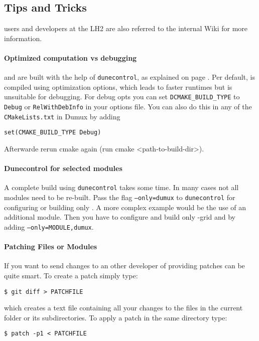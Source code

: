 \subsection{Tips and Tricks}
\Dumux users and developers at the LH2 are also referred to the internal Wiki for
more information.

\paragraph{Optimized computation vs debugging}
\Dune and \Dumux are built with the help of \texttt{dunecontrol}, as explained on page \pageref{buildIt}.
Per default, \Dumux is compiled using optimization options, which leads to faster runtimes but is unsuitable
for debugging. For debug opts you can set \texttt{DCMAKE_BUILD_TYPE} to \texttt{Debug} or \texttt{RelWithDebInfo}
in your options file. You can also do this in any of the \texttt{CMakeLists.txt} in Dumux by adding

\begin{lstlisting}[style=Shell]
set(CMAKE_BUILD_TYPE Debug)
\end{lstlisting}

Afterwarde rerun cmake again (run cmake <path-to-build-dir>).

\paragraph{Dunecontrol for selected modules}
A complete build using \texttt{dunecontrol} takes some time. In many cases not all modules need to be re-built.
Pass the flag \texttt{--only=dumux} to \texttt{dunecontrol} for configuring or building only \Dumux. A more
complex example would be the use of an additional module. Then you have to configure and build only \Dune{}-grid
and \Dumux by adding \texttt{--only=MODULE,dumux}.

\paragraph{Patching Files or Modules}
If you want to send changes to an other developer of \Dumux providing patches
can be quite smart. To create a patch simply type:
\begin{lstlisting}[style=Bash]
$ git diff > PATCHFILE
\end{lstlisting}
\noindent which creates a text file containing all your changes to the files
in the current folder or its subdirectories.
To apply a patch in the same directory type:
\begin{lstlisting}[style=Bash]
$ patch -p1 < PATCHFILE
\end{lstlisting}

